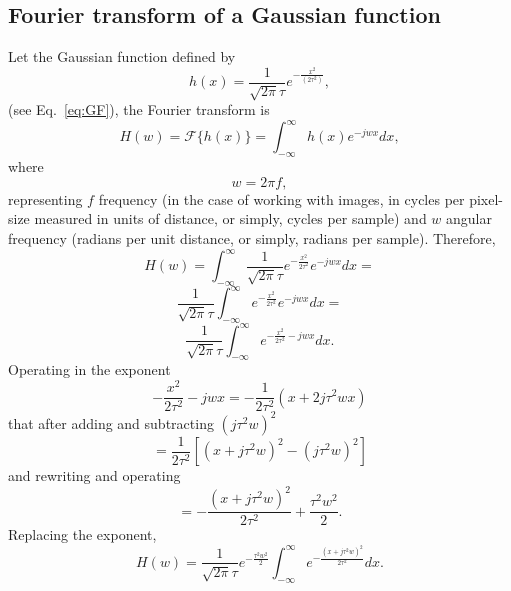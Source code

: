 \begin{subappendices}

\section{Fourier transform of a Gaussian function}
\label{sec:FTGF}

Let the Gaussian function defined by
\begin{equation}
  h(x) = \frac{1}{\sqrt{2\pi}\tau}e^{-\frac{{x}^2}{(2\tau^2)}},
  \label{eq:gaussian_ape}
\end{equation}
(see Eq.~\ref{eq:GF}), the Fourier transform  is
\begin{equation}
  H(w) = \mathcal{F}\{h(x)\} = \int_{-\infty}^{\infty}h(x)e^{-jwx}dx,
\end{equation}
where
\begin{equation}
  w = 2\pi f,
\end{equation}
representing $f$ frequency (in the case of working with images, in
cycles per pixel-size measured in units of distance, or simply, cycles
per sample) and $w$ angular frequency (radians per unit distance, or
simply, radians per sample). Therefore,
\begin{equation*}
  H(w) = \int_{-\infty}^{\infty}\frac{1}{\sqrt{2\pi}\tau}e^{-\frac{x^2}{2\tau^2}}e^{-jwx}dx = 
\end{equation*}
\begin{equation*}
  \frac{1}{\sqrt{2\pi}\tau}\int_{-\infty}^{\infty}e^{-\frac{x^2}{2\tau^2}}e^{-jwx}dx = 
\end{equation*}
\begin{equation*}
  \frac{1}{\sqrt{2\pi}\tau}\int_{-\infty}^{\infty}e^{-\frac{x^2}{2\tau^2}-jwx}dx.
\end{equation*}
Operating in the exponent
\begin{equation*}
  -\frac{x^2}{2\tau^2}-jwx = -\frac{1}{2\tau^2}(x+2j\tau^2wx)
\end{equation*}
that after adding and subtracting $(j\tau^2w)^2$
\begin{equation*}
  = \frac{1}{2\tau^2}[(x+j\tau^2w)^2-(j\tau^2w)^2]
\end{equation*}
and rewriting and operating
\begin{equation*}
  = -\frac{(x+j\tau^2w)^2}{2\tau^2} + \frac{\tau^2w^2}{2}.
\end{equation*}
Replacing the exponent,
\begin{equation*}
  H(w) = \frac{1}{\sqrt{2\pi}\tau}e^{-\frac{\tau^2w^2}{2}}\int_{-\infty}^{\infty}e^{-\frac{(x+j\tau^2w)^2}{2\tau^2}}dx.

\end{equation*}
\end{subappendices}
